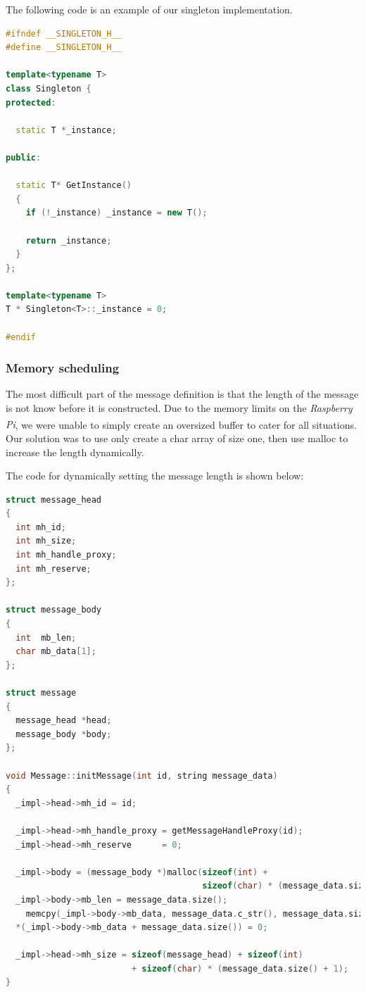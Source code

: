 \documentclass[11pt,a4paper,titlepage]{report}
\newcommand{\rpi}{\textit{Raspberry Pi\textsuperscript{\textregistered}}}
\begin{document}
The following code is an example of our singleton implementation.

\begin{lstlisting}[caption={Singleton implementation example},language=C++]
#ifndef __SINGLETON_H__
#define __SINGLETON_H__

template<typename T>
class Singleton {
protected:

  static T *_instance;

public:

  static T* GetInstance()
  {
    if (!_instance) _instance = new T();

    return _instance;
  }
};

template<typename T>
T * Singleton<T>::_instance = 0;

#endif
\end{lstlisting}

\subsubsection{Memory scheduling}

The most difficult part of the message definition is that the length of the message is not know before it is constructed. Due to the memory limits on the \rpi, we were unable to simply create an oversized buffer to cater for all situations. Our solution was to use only create a char array of size one, then use malloc to increase the length dynamically.

The code for dynamically setting the message length is shown below:

\begin{lstlisting}[caption={Example of dynamic message length allocation},language=C++]
struct message_head
{
  int mh_id;
  int mh_size;
  int mh_handle_proxy;
  int mh_reserve;
};

struct message_body
{
  int  mb_len;
  char mb_data[1];
};

struct message
{
  message_head *head;
  message_body *body;
};

void Message::initMessage(int id, string message_data)
{
  _impl->head->mh_id = id;

  _impl->head->mh_handle_proxy = getMessageHandleProxy(id);
  _impl->head->mh_reserve      = 0;

  _impl->body = (message_body *)malloc(sizeof(int) +
                                       sizeof(char) * (message_data.size() + 1));
  _impl->body->mb_len = message_data.size();
    memcpy(_impl->body->mb_data, message_data.c_str(), message_data.size());
  *(_impl->body->mb_data + message_data.size()) = 0;

  _impl->head->mh_size = sizeof(message_head) + sizeof(int)
                         + sizeof(char) * (message_data.size() + 1);
}

\end{lstlisting}
\end{document}
